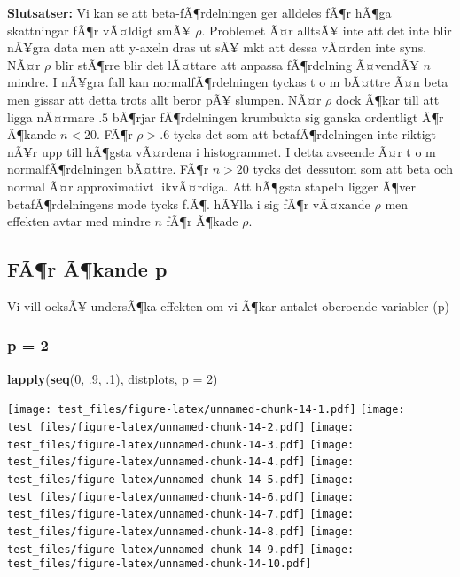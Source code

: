 \documentclass[]{article}
\newenvironment{Shaded}{\begin{snugshade}}{\end{snugshade}}
\newcommand{\KeywordTok}[1]{\textcolor[rgb]{0.13,0.29,0.53}{\textbf{{#1}}}}
\newcommand{\DataTypeTok}[1]{\textcolor[rgb]{0.13,0.29,0.53}{{#1}}}
\newcommand{\DecValTok}[1]{\textcolor[rgb]{0.00,0.00,0.81}{{#1}}}
\newcommand{\NormalTok}[1]{{#1}}
\begin{document}
\textbf{Slutsatser:} Vi kan se att beta-fÃ¶rdelningen ger alldeles fÃ¶r
hÃ¶ga skattningar fÃ¶r vÃ¤ldigt smÃ¥ \(\rho\). Problemet Ã¤r alltsÃ¥
inte att det inte blir nÃ¥gra data men att y-axeln dras ut sÃ¥ mkt att
dessa vÃ¤rden inte syns. NÃ¤r \(\rho\) blir stÃ¶rre blir det lÃ¤ttare
att anpassa fÃ¶rdelning Ã¤vendÃ¥ \(n\) mindre. I nÃ¥gra fall kan
normalfÃ¶rdelningen tyckas t o m bÃ¤ttre Ã¤n beta men gissar att detta
trots allt beror pÃ¥ slumpen. NÃ¤r \(\rho\) dock Ã¶kar till att ligga
nÃ¤rmare \(.5\) bÃ¶rjar fÃ¶rdelningen krumbukta sig ganska ordentligt
Ã¶r Ã¶kande \(n<20\). FÃ¶r \(\rho > .6\) tycks det som att
betafÃ¶rdelningen inte riktigt nÃ¥r upp till hÃ¶gsta vÃ¤rdena i
histogrammet. I detta avseende Ã¤r t o m normalfÃ¶rdelningen bÃ¤ttre.
FÃ¶r \(n> 20\) tycks det dessutom som att beta och normal Ã¤r
approximativt likvÃ¤rdiga. Att hÃ¶gsta stapeln ligger Ã¶ver
betafÃ¶rdelningens mode tycks f.Ã¶. hÃ¥lla i sig fÃ¶r vÃ¤xande \(\rho\)
men effekten avtar med mindre \(n\) fÃ¶r Ã¶kade \(\rho\).

\subsection{FÃ¶r Ã¶kande p}\label{far-akande-p}

Vi vill ocksÃ¥ undersÃ¶ka effekten om vi Ã¶kar antalet oberoende
variabler (p)

\subsubsection{p = 2}\label{p-2}

\begin{Shaded}
\begin{Highlighting}[]
\KeywordTok{lapply}\NormalTok{(}\KeywordTok{seq}\NormalTok{(}\DecValTok{0}\NormalTok{, .}\DecValTok{9}\NormalTok{, .}\DecValTok{1}\NormalTok{), distplots, }\DataTypeTok{p =} \DecValTok{2}\NormalTok{)}
\end{Highlighting}
\end{Shaded}

\texttt{[image: test\_files/figure-latex/unnamed-chunk-14-1.pdf]}
\texttt{[image: test\_files/figure-latex/unnamed-chunk-14-2.pdf]}
\texttt{[image: test\_files/figure-latex/unnamed-chunk-14-3.pdf]}
\texttt{[image: test\_files/figure-latex/unnamed-chunk-14-4.pdf]}
\texttt{[image: test\_files/figure-latex/unnamed-chunk-14-5.pdf]}
\texttt{[image: test\_files/figure-latex/unnamed-chunk-14-6.pdf]}
\texttt{[image: test\_files/figure-latex/unnamed-chunk-14-7.pdf]}
\texttt{[image: test\_files/figure-latex/unnamed-chunk-14-8.pdf]}
\texttt{[image: test\_files/figure-latex/unnamed-chunk-14-9.pdf]}
\texttt{[image: test\_files/figure-latex/unnamed-chunk-14-10.pdf]}
\end{document}
